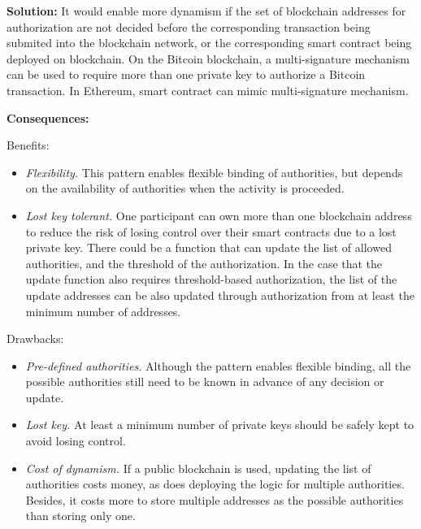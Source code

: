 \vspace{0.5em}\noindent \textbf{Solution:} 
It would enable more dynamism if the set of blockchain addresses for authorization are not decided before the corresponding transaction being submited into the blockchain network, or the corresponding smart contract being deployed on blockchain. On the Bitcoin blockchain, a multi-signature mechanism can be used to require more than one private key to authorize a Bitcoin transaction. In Ethereum, smart contract can mimic multi-signature mechanism. %


\vspace{0.5em}\noindent \textbf{Consequences:} 

Benefits:
\begin{itemize}
  \item \textit{Flexibility.} This pattern enables flexible binding of authorities, but depends on the availability of authorities when the activity is proceeded. 
  \item \textit{Lost key tolerant.} One participant can own more than one blockchain address to reduce the risk of losing control over their smart contracts due to a lost private key. There could be a function that can update the list of allowed authorities, and the threshold of the authorization. In the case that the update function also requires threshold-based authorization, the list of the update addresses can be also updated through authorization from at least the minimum number of addresses.
\end{itemize}

Drawbacks: 
\begin{itemize}
  \item \textit{Pre-defined authorities.} Although the pattern enables flexible binding, all the possible authorities still need to be known in advance of any decision or update. 
  \item \textit{Lost key.} At least %
  a minimum number of private keys should be safely kept to avoid losing control.
  \item \textit{Cost of dynamism.} If a public blockchain is used, updating the list of authorities costs money, as does deploying the logic for multiple authorities. Besides, it costs more to store multiple addresses as the possible authorities than storing only one. 
\end{itemize}


